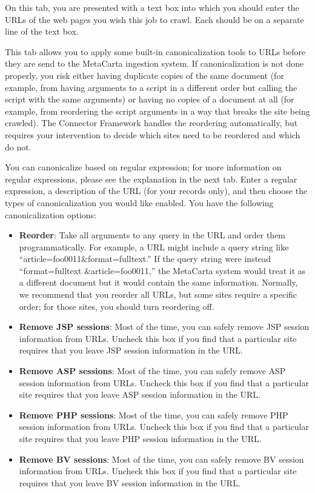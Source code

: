 On this tab, you are presented with a text box into which you should
enter the URLs of the web pages you wish this job to crawl. Each
should be on a separate line of the text box.


This tab allows you to apply some built-in canonicalization tools
to URLs before they are send to the MetaCarta ingestion system. If
canonicalization is not done properly, you risk either having duplicate
copies of the same document (for example, from having arguments to
a script in a different order but calling the script with the same
arguments) or having no copies of a document at all (for example, from
reordering the script arguments in a way that breaks the site being
crawled). The Connector Framework handles the reordering automatically,
but requires your intervention to decide which sites need to be reordered
and which do not.

You can canonicalize based on regular expression; for more information on
regular expressions, please see the explanation in the next tab. Enter
a regular expression, a description of the URL (for your records only),
and then choose the types of canonicalization you would like enabled. You
have the following canonicalization options:

\begin{itemize}

\item \textbf{Reorder}: Take all arguments to any query in the URL and
order them programmatically. For example, a URL might include a query
string like ``article=foo0011\&format=fulltext.'' If the query string
were instead ``format=fulltext \&article=foo0011,'' the MetaCarta system
would treat it as a different document but it would contain the same
information. Normally, we recommend that you reorder all URLs, but
some sites require a specific order; for those sites, you should turn
reordering off.

\item \textbf{Remove JSP sessions}: Most of the time, you can safely
remove JSP session information from URLs. Uncheck this box if you find
that a particular site requires that you leave JSP session information
in the URL.

\item \textbf{Remove ASP sessions}: Most of the time, you can safely
remove ASP session information from URLs. Uncheck this box if you find
that a particular site requires that you leave ASP session information
in the URL.

\item \textbf{Remove PHP sessions}: Most of the time, you can safely
remove PHP session information from URLs. Uncheck this box if you find
that a particular site requires that you leave PHP session information
in the URL.

\item \textbf{Remove BV sessions}: Most of the time, you can safely
remove BV session information from URLs. Uncheck this box if you find
that a particular site requires that you leave BV session information
in the URL.

\end{itemize}

